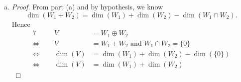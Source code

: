 \begin{Exercise}
\begin{enumerate}[(a)]
\begin{proof}
			We prove the claim holds as promised. Finally, we compute
			\begin{align}
			\dim(W_1+W_2) 
			&= k+m+p \notag \\
			&= (k+m) + (k+p) - k \notag \\
			&= \dim(W_1) + \dim(W_2) - \dim(W_1\cap W_2). \label{eq:ex_1.6.29a3}
			\end{align}
			
			By hypothesis that $W_1,W_2$ are finite-dimensional vector spaces, we know $W_1\cap W_2$ is also finite-dimensional; hence we obtain $k+m,k+p,k<\infty$. From formula \eqref{eq:ex_1.6.29a3}, we conclude $W_1+W_2$ is also a finite-dimensional vector space since $k+m+p<\infty$.
		\end{proof}
		
		\item
		\begin{proof}
			From part (a) and by hypothesis, we know
			$$
			\dim(W_1+W_2) = \dim(W_1)+\dim(W_2)-\dim(W_1\cap W_2).
			$$
			Hence
			\begin{alignat*}{7}
			\quad&& V &= W_1\oplus W_2 \\
			\iff&& V &= W_1+W_2\text{ and }W_1\cap W_2=\{0\} \\
			\iff&& \dim(V) &= \dim(W_1)+\dim(W_2)-\dim(\{0\}) \\
			\iff&& \dim(V) &= \dim(W_1)+\dim(W_2)
			\end{alignat*}
		\end{proof}
	\end{enumerate}
\end{Exercise}